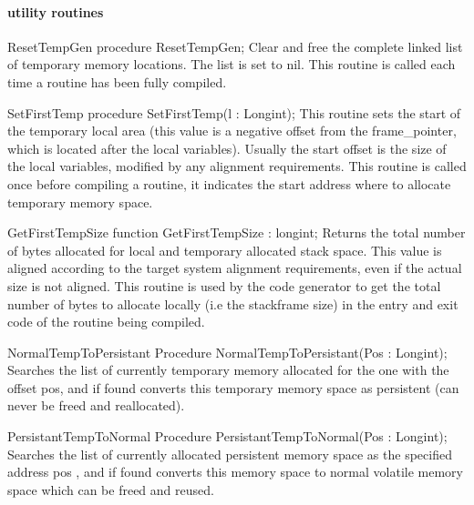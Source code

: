 \documentclass [a4paper,12pt]{article}
\begin{document}
\paragraph{utility routines}

\begin{procedure}{ResetTempGen}
\Declaration
procedure ResetTempGen;
\Description
Clear and free the complete linked list of temporary memory locations. The
list is set to nil.
\Notes
This routine is called each time a routine has been fully compiled.
\end{procedure}

\begin{procedure}{SetFirstTemp}
\Declaration
procedure SetFirstTemp(l : Longint);
\Description
This routine sets the start of the temporary local area (this value is a
negative offset from the frame{\_}pointer, which is located after the local
variables). Usually the start offset is the size of the local variables,
modified by any alignment requirements.
\Notes
This routine is called once before compiling a routine, it indicates the
start address where to allocate temporary memory space.
\end{procedure}

\begin{function}{GetFirstTempSize}
\Declaration
function GetFirstTempSize : longint;
\Description
Returns the total number of bytes allocated for local and temporary
allocated stack space. This value is aligned according to the target system
alignment requirements, even if the actual size is not aligned.
\Notes
This routine is used by the code generator to get the total number of bytes
to allocate locally (i.e the stackframe size) in the entry and exit code of
the routine being compiled.
\end{function}

\begin{function}{NormalTempToPersistant}
\Declaration
Procedure NormalTempToPersistant(Pos : Longint);
\Description
Searches the list of currently temporary memory allocated for the one with
the offset \textsf{pos, }and if found converts this temporary memory space
as persistent (can never be freed and reallocated).
\end{function}

\begin{function}{PersistantTempToNormal}
\Declaration
Procedure PersistantTempToNormal(Pos : Longint);
\Description
Searches the list of currently allocated persistent memory space as the
specified address \textsf{pos }, and if found converts this memory space to
normal volatile memory space which can be freed and reused.
\end{function}
\end{document}
